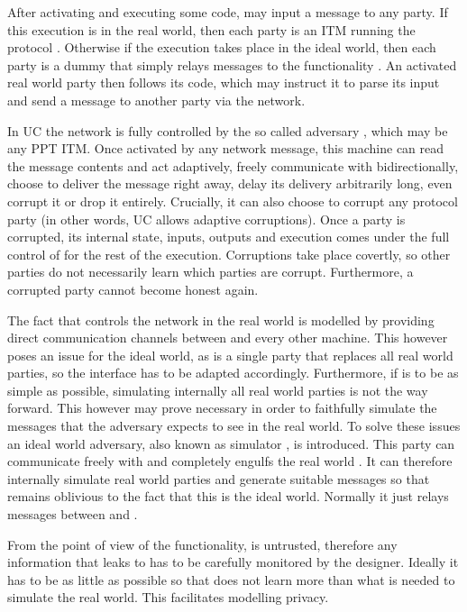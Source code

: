   After activating and executing some code, \environment may input a message to
  any party. If this execution is in the real world, then each party is an ITM
  running the protocol \prot. Otherwise if the execution takes place in the
  ideal world, then each party is a dummy that simply relays messages to the
  functionality \func. An activated real world party then follows its code,
  which may instruct it to parse its input and send a message to another party
  via the network.

  In UC the network is fully controlled by the so called adversary \adversary,
  which may be any PPT ITM. Once activated by any network message, this machine
  can read the message contents and act adaptively, freely communicate with
  \environment bidirectionally, choose to deliver the message right away, delay
  its delivery arbitrarily long, even corrupt it or drop it entirely. Crucially,
  it can also choose to corrupt any protocol party (in other words, UC allows
  adaptive corruptions). Once a party is corrupted, its internal state, inputs,
  outputs and execution comes under the full control of \adversary for the rest
  of the execution. Corruptions take place covertly, so other parties do not
  necessarily learn which parties are corrupt. Furthermore, a corrupted party
  cannot become honest again.

  The fact that \adversary controls the network in the real world is modelled by
  providing direct communication channels between \adversary and every other
  machine. This however poses an issue for the ideal world, as \func is a single
  party that replaces all real world parties, so the interface has to be adapted
  accordingly. Furthermore, if \func is to be as simple as possible, simulating
  internally all real world parties is not the way forward. This however may
  prove necessary in order to faithfully simulate the messages that the
  adversary expects to see in the real world. To solve these issues an ideal
  world adversary, also known as simulator \simulator, is introduced. This party
  can communicate freely with \func and completely engulfs the real world
  \adversary. It can therefore internally simulate real world parties and
  generate suitable messages so that \adversary remains oblivious to the fact
  that this is the ideal world. Normally it just relays messages between
  \adversary and \environment.

  From the point of view of the functionality, \simulator is untrusted,
  therefore any information that \func leaks to \simulator has to be carefully
  monitored by the designer. Ideally it has to be as little as possible so that
  \simulator does not learn more than what is needed to simulate the real world.
  This facilitates modelling privacy.

